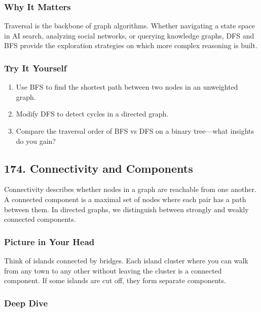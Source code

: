\documentclass[
  letterpaper,
  DIV=11,
  numbers=noendperiod]{scrreprt}
\providecommand{\tightlist}{%
  \setlength{\itemsep}{0pt}\setlength{\parskip}{0pt}}
\begin{document}
\subsubsection{Why It Matters}\label{why-it-matters-70}

Traversal is the backbone of graph algorithms. Whether navigating a
state space in AI search, analyzing social networks, or querying
knowledge graphs, DFS and BFS provide the exploration strategies on
which more complex reasoning is built.

\subsubsection{Try It Yourself}\label{try-it-yourself-172}

\begin{enumerate}
\def\labelenumi{\arabic{enumi}.}
\tightlist
\item
  Use BFS to find the shortest path between two nodes in an unweighted
  graph.
\item
  Modify DFS to detect cycles in a directed graph.
\item
  Compare the traversal order of BFS vs DFS on a binary tree---what
  insights do you gain?
\end{enumerate}

\subsection{174. Connectivity and
Components}\label{connectivity-and-components}

Connectivity describes whether nodes in a graph are reachable from one
another. A connected component is a maximal set of nodes where each pair
has a path between them. In directed graphs, we distinguish between
strongly and weakly connected components.

\subsubsection{Picture in Your Head}\label{picture-in-your-head-173}

Think of islands connected by bridges. Each island cluster where you can
walk from any town to any other without leaving the cluster is a
connected component. If some islands are cut off, they form separate
components.

\subsubsection{Deep Dive}\label{deep-dive-173}
\end{document}
